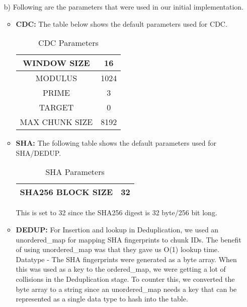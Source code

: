 \documentclass[../main.tex]{subfiles}
\begin{document}
\begin{enumerate}
    \item [b)] Following are the parameters that were used in our initial implementation.
    \begin{itemize}
        \item \textbf{CDC:} The table below shows the default parameters used for CDC.
            \begin{table}[H]
                \centering
                \begin{tabular}{|c|c|} \hline 
                     WINDOW SIZE& 16\\ \hline 
                     MODULUS& 1024\\ \hline 
                     PRIME& 3\\ \hline 
                     TARGET& 0\\ \hline 
                     MAX CHUNK SIZE& 8192\\ \hline
                \end{tabular}
                \caption{CDC Parameters}
                \label{tab:cdc_params}
            \end{table}
            
        \item \textbf{SHA:} The following table shows the default parameters used for SHA/DEDUP.
        
        \begin{table}[H]
            \centering
            \begin{tabular}{|c|c|} \hline 
                 SHA256 BLOCK SIZE& 32\\ \hline
            \end{tabular}
            \caption{SHA Parameters}
            \label{tab:sha_params}
        \end{table}
        
        This is set to 32 since the SHA256 digest is 32 byte/256 bit long.

        \item \textbf{DEDUP:} For Insertion and lookup in Deduplication, we used an unordered\_map for mapping SHA fingerprints to chunk
        IDs. The benefit of using unordered\_map was that they
        gave us O(1) lookup time. \\
        Datatype - The SHA fingerprints were generated as a byte array. When this was used as a key to the ordered\_map, we were getting a lot of collisions in the Deduplication stage. To counter this, we converted the byte array to a string since an unordered\_map needs a key that can be represented as a single data type to hash into the table.


\end{itemize}
\end{enumerate}
\end{document}
